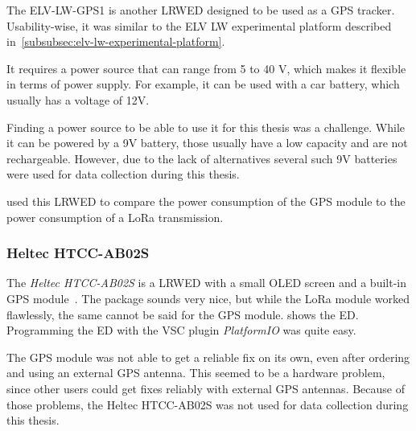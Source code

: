 The ELV-LW-GPS1 is another \acl{LRWED} designed to be used as a \ac{GPS} tracker.
Usability-wise, it was similar to the ELV LW experimental platform described in~\cref{subsubsec:elv-lw-experimental-platform}.

It requires a power source that can range from 5 to 40 V, which makes it flexible in terms of power supply.
For example, it can be used with a car battery, which usually has a voltage of 12V.

Finding a power source to be able to use it for this thesis was a challenge.
While it can be powered by a 9V battery, those usually have a low capacity and are not rechargeable.
However, due to the lack of alternatives several such 9V batteries were used for data collection during this thesis.

 used this \acl{LRWED} to compare the power consumption of the \ac{GPS} module to the power consumption of a \ac{LoRa} transmission.

\subsubsection{Heltec HTCC-AB02S}\label{subsubsec:heltec-htcc-ab02s}

The \emph{Heltec HTCC-AB02S} is a \acl{LRWED} with a small OLED screen and a built-in \ac{GPS} module~\cite{heltec_automation_cubecell_2020}.
The package sounds very nice, but while the \ac{LoRa} module worked flawlessly, the same cannot be said for the \ac{GPS} module.
 shows the \acl{ED}.
Programming the \acl{ED} with the \ac{VSC} plugin \emph{PlatformIO} was quite easy.

The \ac{GPS} module was not able to get a reliable fix on its own, even after ordering and using an external GPS antenna.
This seemed to be a hardware problem, since other users could get fixes reliably with external \ac{GPS} antennas.
Because of those problems, the Heltec HTCC-AB02S was not used for data collection during this thesis.

